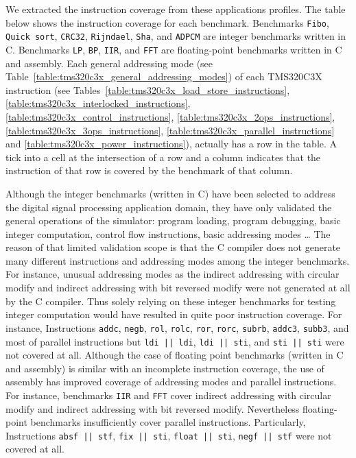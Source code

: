 We extracted the instruction coverage from these applications profiles.
The table below shows the instruction coverage for each benchmark.
Benchmarks \texttt{Fibo}, \texttt{Quick sort}, \texttt{CRC32}, \texttt{Rijndael}, \texttt{Sha}, and \texttt{ADPCM} are integer benchmarks written in C.
Benchmarks \texttt{LP}, \texttt{BP}, \texttt{IIR}, and \texttt{FFT} are floating-point benchmarks written in C and assembly.
Each general addressing mode (see Table~\ref{table:tms320c3x_general_addressing_modes}) of each TMS320C3X instruction (see Tables~\ref{table:tms320c3x_load_store_instructions}, \ref{table:tms320c3x_interlocked_instructions},  \ref{table:tms320c3x_control_instructions}, \ref{table:tms320c3x_2ops_instructions}, \ref{table:tms320c3x_3ops_instructions}, \ref{table:tms320c3x_parallel_instructions} and \ref{table:tms320c3x_power_instructions}), actually has a row in the table.
A tick into a cell at the intersection of a row and a column indicates that the instruction of that row is covered by the benchmark of that column.

Although the integer benchmarks (written in C) have been selected to address the digital signal processing application domain, they have only validated the general operations of the simulator: program loading, program debugging, basic integer computation, control flow instructions, basic addressing modes \ldots
The reason of that limited validation scope is that the C compiler does not generate many different instructions and addressing modes among the integer benchmarks.
For instance, unusual addressing modes as the indirect addressing with circular modify and indirect addressing with bit reversed modify were not generated at all by the C compiler. 
Thus solely relying on these integer benchmarks for testing integer computation would have resulted in quite poor instruction coverage.
For instance, Instructions \texttt{addc}, \texttt{negb}, \texttt{rol}, \texttt{rolc}, \texttt{ror}, \texttt{rorc}, \texttt{subrb}, \texttt{addc3}, \texttt{subb3}, and most of parallel instructions but \texttt{ldi || ldi}, \texttt{ldi || sti}, and \texttt{sti || sti} were not covered at all.
Although the case of floating point benchmarks (written in C and assembly) is similar with an incomplete instruction coverage, the use of assembly has improved coverage of addressing modes and parallel instructions.
For instance, benchmarks \texttt{IIR} and \texttt{FFT} cover indirect addressing with circular modify and indirect addressing with bit reversed modify.
Nevertheless floating-point benchmarks insufficiently cover parallel instructions.
Particularly, Instructions \texttt{absf || stf}, \texttt{fix || sti}, \texttt{float || sti}, \texttt{negf || stf} were not covered at all.

